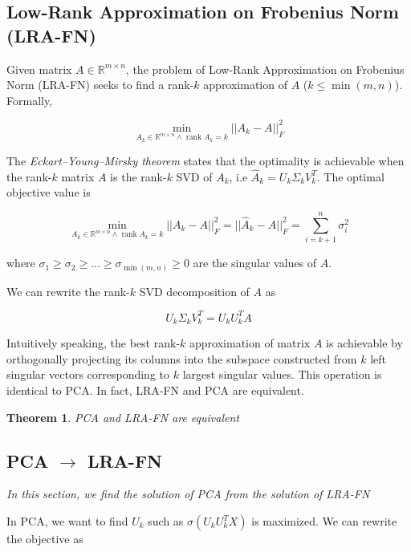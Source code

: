 \documentclass{article}
\DeclareMathOperator{\rank}{rank}
\newtheorem{theorem}{Theorem}
\begin{document}
\subsection{Low-Rank Approximation on Frobenius Norm (LRA-FN)}

Given matrix $A \in \mathbb{R}^{m \times n}$, the problem of Low-Rank Approximation on Frobenius Norm (LRA-FN) seeks to find a rank-$k$ approximation of $A$ ($k \leq \min(m, n)$). Formally,

\begin{equation}
    \min_{A_k \in \mathbb{R}^{m \times n} \land \rank A_k = k} ||A_k - A||_F^2
\end{equation}

The \emph{Eckart–Young–Mirsky theorem} states that the optimality is achievable when the rank-$k$ matrix $A$ is the rank-$k$ SVD of $A_k$, i.e $\hat{A}_k = U_k \Sigma_k V_k^T$. The optimal objective value is

\begin{equation}
    \min_{A_k \in \mathbb{R}^{m \times n} \land \rank A_k = k} ||A_k - A||_F^2 = ||\hat{A}_k - A||_F^2 = \sum_{i=k+1}^{n} \sigma_i^2
\end{equation}

where $\sigma_1 \geq \sigma_2 \geq ... \geq \sigma_{\min(m, n)} \geq 0$ are the singular values of $A$.

We can rewrite the rank-$k$ SVD decomposition of $A$ as

\begin{equation}
    U_k \Sigma_k V_k^T = U_k U_k^T A
\end{equation}

Intuitively speaking, the best rank-$k$ approximation of matrix $A$ is achievable by orthogonally projecting its columns into the subspace constructed from $k$ left singular vectors corresponding to $k$ largest singular values. This operation is identical to PCA. In fact, LRA-FN and PCA are equivalent.

\begin{theorem}
    PCA and LRA-FN are equivalent
\end{theorem}

\subsection{PCA $\to$ LRA-FN}

\emph{In this section, we find the solution of PCA from the solution of LRA-FN}

In PCA, we want to find $U_k$ such as $\sigma(U_k U_k^T X)$ is maximized. We can rewrite the objective as
\end{document}
